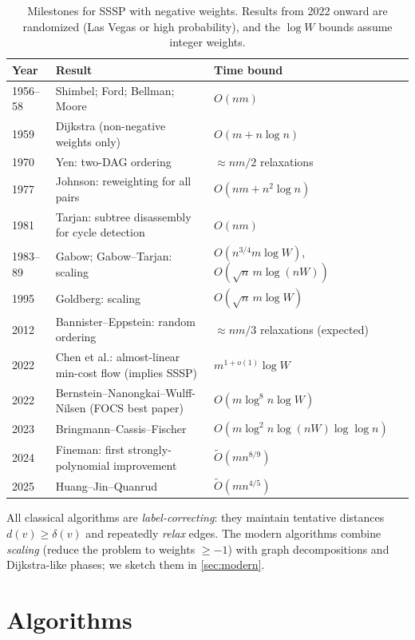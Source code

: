 \documentclass[11pt,a4paper]{article}
\theoremstyle{definition}
\newcommand{\dd}{\mathit{d}}
\newcommand{\Ot}{\tilde{O}}
\begin{document}
\begin{table}[H]
\centering
\small
\begin{tabular}{@{}lll@{}}
\toprule
\textbf{Year} & \textbf{Result} & \textbf{Time bound}\\
\midrule
1956--58 & Shimbel; Ford; Bellman; Moore & $O(nm)$\\
1959 & Dijkstra (non-negative weights only) & $O(m+n\log n)$\\
1970 & Yen: two-DAG ordering & $\approx nm/2$ relaxations\\
1977 & Johnson: reweighting for all pairs & $O(nm + n^2\log n)$\\
1981 & Tarjan: subtree disassembly for cycle detection & $O(nm)$\\
1983--89 & Gabow; Gabow--Tarjan: scaling & $O(n^{3/4} m\log W)$, $O(\sqrt n\, m\log(nW))$\\
1995 & Goldberg: scaling & $O(\sqrt n\, m\log W)$\\
2012 & Bannister--Eppstein: random ordering & $\approx nm/3$ relaxations (expected)\\
2022 & Chen et al.: almost-linear min-cost flow (implies SSSP) & $m^{1+o(1)}\log W$\\
2022 & Bernstein--Nanongkai--Wulff-Nilsen (FOCS best paper) & $O(m\log^8 n\log W)$\\
2023 & Bringmann--Cassis--Fischer & $O(m\log^2 n\log(nW)\log\log n)$\\
2024 & Fineman: first strongly-polynomial improvement & $\Ot(mn^{8/9})$\\
2025 & Huang--Jin--Quanrud & $\Ot(mn^{4/5})$\\
\bottomrule
\end{tabular}
\caption{Milestones for SSSP with negative weights. Results from 2022 onward are randomized (Las Vegas or high probability), and the $\log W$ bounds assume integer weights.}
\label{tab:history}
\end{table}

All classical algorithms are \emph{label-correcting}: they maintain tentative distances $\dd(v)\ge\delta(v)$ and repeatedly \emph{relax} edges. The modern algorithms combine \emph{scaling} (reduce the problem to weights $\ge -1$) with graph decompositions and Dijkstra-like phases; we sketch them in \cref{sec:modern}.

\section{Algorithms}
\end{document}
